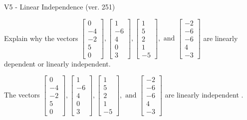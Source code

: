 \begin{exercise}
  \begin{exerciseTitle}V5 - Linear Independence (ver. 251)\end{exerciseTitle}
  \begin{exerciseStatement}
    Explain why the vectors \(\left[\begin{array}{r}
0 \\
-4 \\
-2 \\
5 \\
0
\end{array}\right] , \left[\begin{array}{r}
1 \\
-6 \\
4 \\
0 \\
3
\end{array}\right] , \left[\begin{array}{r}
1 \\
5 \\
2 \\
1 \\
-5
\end{array}\right] , \text{ and } \left[\begin{array}{r}
-2 \\
-6 \\
-6 \\
4 \\
-3
\end{array}\right]\) are linearly dependent or linearly independent.	


  \end{exerciseStatement}
  \begin{exerciseAnswer}
   The vectors \(\left[\begin{array}{r}
0 \\
-4 \\
-2 \\
5 \\
0
\end{array}\right] , \left[\begin{array}{r}
1 \\
-6 \\
4 \\
0 \\
3
\end{array}\right] , \left[\begin{array}{r}
1 \\
5 \\
2 \\
1 \\
-5
\end{array}\right] , \text{ and } \left[\begin{array}{r}
-2 \\
-6 \\
-6 \\
4 \\
-3
\end{array}\right]\) are 
  	 linearly independent  .
  


  \end{exerciseAnswer}
\end{exercise}